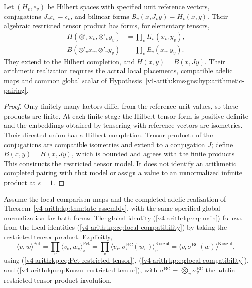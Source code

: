 \begin{theorem}
\label{v4-arith:kp:thm:tate-assembly}
Let \((H_v,e_v)\) be Hilbert spaces with specified unit reference
vectors, conjugations \(J_v e_v=e_v\), and bilinear forms
\(B_v(x,J_vy)=H_v(x,y)\). Their algebraic restricted tensor product
has forms, for elementary tensors,
\begin{align}
\label{v4-arith:kp:eq:Pet-restricted-tensor}
 H(\otimes'_v x_v,\otimes'_v y_v)&=\prod_v H_v(x_v,y_v),\\
\label{v4-arith:kp:eq:Koszul-restricted-tensor}
 B(\otimes'_v x_v,\otimes'_v y_v)&=\prod_v B_v(x_v,y_v).
\end{align}
They extend to the Hilbert completion, and
\(H(x,y)=B(x,Jy)\). Their arithmetic realization requires the actual
local placements, compatible adelic maps and common global scalar
of Hypothesis~\ref{v4-arith:kms-gns:hyp:arithmetic-pairing}.
\end{theorem}
\begin{proof}
Only finitely many factors differ from the reference unit values,
so these products are finite. At each finite stage the Hilbert tensor
form is positive definite and the embeddings obtained by tensoring
with reference vectors are isometries. Their directed union has a
Hilbert completion. Tensor products of the conjugations are
compatible isometries and extend to a conjugation \(J\); define
\(B(x,y)=H(x,Jy)\), which is bounded and agrees with the finite
products. This constructs the restricted tensor model. It does not
identify an arithmetic completed pairing with that model or assign
a value to an unnormalized infinite product at \(s=1\).
\end{proof}

\begin{corollary}
\label{v4-arith:kp:cor:global-from-local}
Assume the local comparison maps and the completed adelic
realization of Theorem~\ref{v4-arith:kp:thm:tate-assembly}, with
the same specified global normalization for both forms. The global identity
(\ref{v4-arith:kp:eq:main}) follows from the local identities
(\ref{v4-arith:kp:eq:local-compatibility}) by taking the
restricted tensor product. Explicitly,
\begin{equation*}
\langle v,w\rangle^{\mathrm{Pet}}
=\prod_{v}\langle v_{v},w_{v}\rangle^{\mathrm{Pet}}_{v}
=\prod_{v}\langle v_{v},\sigma^{\mathrm{BC}}_{v}(w_{v})\rangle^{\mathrm{Koszul}}_{v}
=\langle v,\sigma^{\mathrm{BC}}(w)\rangle^{\mathrm{Koszul}},
\end{equation*}
using (\ref{v4-arith:kp:eq:Pet-restricted-tensor}),
(\ref{v4-arith:kp:eq:local-compatibility}), and
(\ref{v4-arith:kp:eq:Koszul-restricted-tensor}), with
\(\sigma^{\mathrm{BC}}=\bigotimes_{v}\sigma^{\mathrm{BC}}_{v}\)
the adelic restricted tensor product involution.
\end{corollary}

